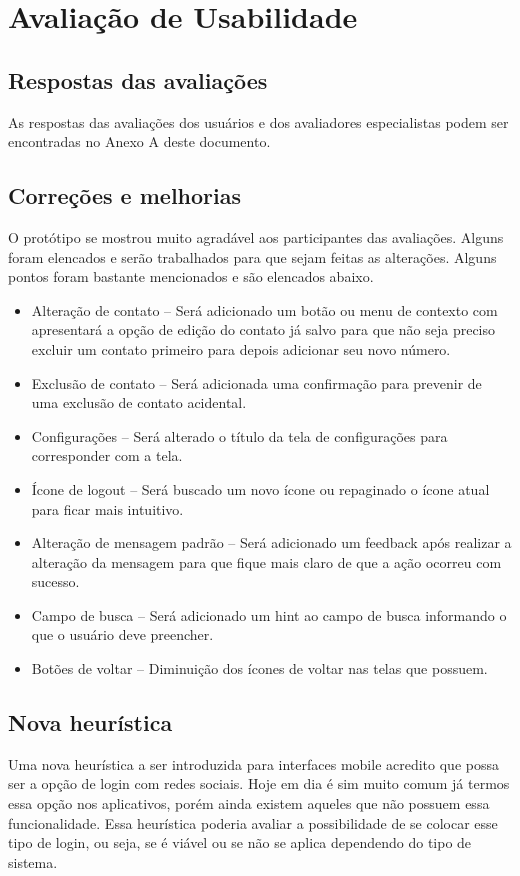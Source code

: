 \section{Avaliação de Usabilidade}
\subsection{Respostas das avaliações}
As respostas das avaliações dos usuários  e dos avaliadores especialistas podem ser encontradas no Anexo A deste documento.
\subsection{Correções e melhorias}
O protótipo se mostrou muito agradável aos participantes das avaliações. Alguns foram elencados e serão trabalhados para que sejam feitas as alterações. Alguns pontos foram bastante mencionados e são elencados abaixo.
\begin{itemize}
\item Alteração de contato – Será adicionado um botão ou menu de contexto com apresentará a opção de edição do contato já salvo para que não seja preciso excluir um contato primeiro para depois adicionar seu novo número.
\item Exclusão de contato – Será adicionada uma confirmação para prevenir de uma exclusão de contato acidental.
\item Configurações – Será alterado o título da tela de configurações para corresponder com a tela.
\item Ícone de logout – Será buscado um novo ícone ou repaginado o ícone atual para ficar mais intuitivo. 
\item Alteração de mensagem padrão – Será adicionado um feedback após realizar a alteração da mensagem para que fique mais claro de que a ação ocorreu com sucesso.
\item Campo de busca – Será adicionado um hint ao campo de busca informando o que o usuário deve preencher.
\item Botões de voltar – Diminuição dos ícones de voltar nas telas que possuem.
\end{itemize}
 
\subsection{Nova heurística}
Uma nova heurística a ser introduzida para interfaces mobile acredito que possa ser a opção de login com redes sociais. Hoje em dia é sim muito comum já termos essa opção nos aplicativos, porém ainda existem aqueles que não possuem essa funcionalidade. Essa heurística poderia avaliar a possibilidade de se colocar esse tipo de login, ou seja, se é viável ou se não se aplica dependendo do tipo de sistema.


